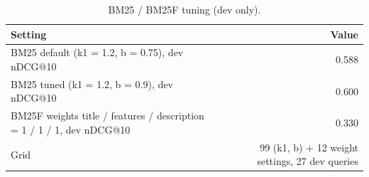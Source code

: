 \begin{table}[t]
\centering
\small
\begin{tabular}{lr}
\toprule
Setting & Value \\
\midrule
BM25 default (k1 = 1.2, b = 0.75), dev nDCG@10 & 0.588 \\
BM25 tuned (k1 = 1.2, b = 0.9), dev nDCG@10 & 0.600 \\
BM25F weights title / features / description = 1 / 1 / 1, dev nDCG@10 & 0.330 \\
Grid & 99 (k1, b) + 12 weight settings, 27 dev queries \\
\bottomrule
\end{tabular}
\caption{BM25 / BM25F tuning (dev only).}
\label{tab:bm25-tuning}
\end{table}
